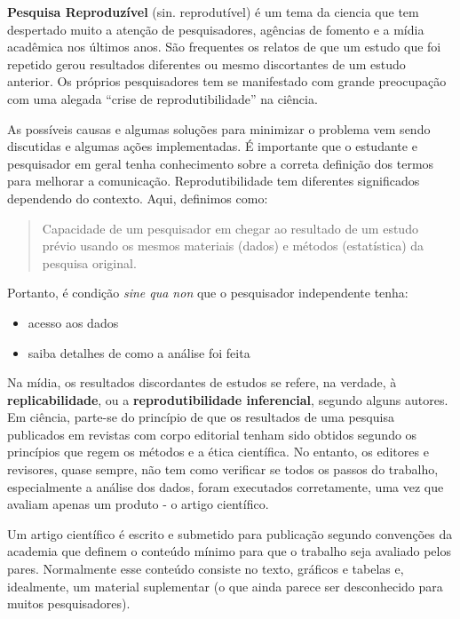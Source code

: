 \documentclass[]{book}
\providecommand{\tightlist}{%
  \setlength{\itemsep}{0pt}\setlength{\parskip}{0pt}}
\begin{document}
\textbf{Pesquisa Reproduzível} (sin. reprodutível) é um tema da ciencia
que tem despertado muito a atenção de pesquisadores, agências de fomento
e a mídia acadêmica nos últimos anos. São frequentes os relatos de que
um estudo que foi repetido gerou resultados diferentes ou mesmo
discortantes de um estudo anterior. Os próprios pesquisadores tem se
manifestado com grande preocupação com uma alegada ``crise de
reprodutibilidade'' na ciência.

As possíveis causas e algumas soluções para minimizar o problema vem
sendo discutidas e algumas ações implementadas. É importante que o
estudante e pesquisador em geral tenha conhecimento sobre a correta
definição dos termos para melhorar a comunicação. Reprodutibilidade tem
diferentes significados dependendo do contexto. Aqui, definimos como:

\begin{quote}
Capacidade de um pesquisador em chegar ao resultado de um estudo prévio
usando os mesmos materiais (dados) e métodos (estatística) da pesquisa
original.
\end{quote}

Portanto, é condição \emph{sine qua non} que o pesquisador independente
tenha:

\begin{itemize}
\tightlist
\item
  acesso aos dados
\item
  saiba detalhes de como a análise foi feita
\end{itemize}

Na mídia, os resultados discordantes de estudos se refere, na verdade, à
\textbf{replicabilidade}, ou a \textbf{reprodutibilidade inferencial},
segundo alguns autores. Em ciência, parte-se do princípio de que os
resultados de uma pesquisa publicados em revistas com corpo editorial
tenham sido obtidos segundo os princípios que regem os métodos e a ética
científica. No entanto, os editores e revisores, quase sempre, não tem
como verificar se todos os passos do trabalho, especialmente a análise
dos dados, foram executados corretamente, uma vez que avaliam apenas um
produto - o artigo científico.

Um artigo científico é escrito e submetido para publicação segundo
convenções da academia que definem o conteúdo mínimo para que o trabalho
seja avaliado pelos pares. Normalmente esse conteúdo consiste no texto,
gráficos e tabelas e, idealmente, um material suplementar (o que ainda
parece ser desconhecido para muitos pesquisadores).
\end{document}
